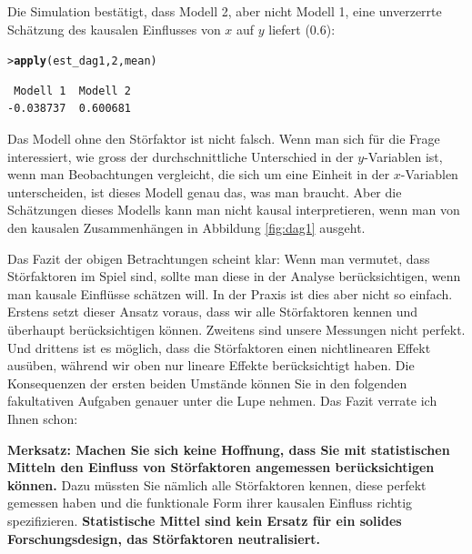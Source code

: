 \documentclass[oneside, 10pt]{book}\usepackage[]{graphicx}\usepackage[]{xcolor}
\makeatletter
\newcommand{\hlnum}[1]{\textcolor[rgb]{0.686,0.059,0.569}{#1}}%
\newcommand{\hlstd}[1]{\textcolor[rgb]{0.345,0.345,0.345}{#1}}%
\newcommand{\hlkwd}[1]{\textcolor[rgb]{0.737,0.353,0.396}{\textbf{#1}}}%
\newenvironment{kframe}{%
 \def\at@end@of@kframe{}%
 \ifinner\ifhmode%
  \def\at@end@of@kframe{\end{minipage}}%
  \begin{minipage}{\columnwidth}%
 \fi\fi%
 \def\FrameCommand##1{\hskip\@totalleftmargin \hskip-\fboxsep
 \colorbox{shadecolor}{##1}\hskip-\fboxsep
     \hskip-\linewidth \hskip-\@totalleftmargin \hskip\columnwidth}%
 \MakeFramed {\advance\hsize-\width
   \@totalleftmargin\z@ \linewidth\hsize
   \@setminipage}}%
 {\par\unskip\endMakeFramed%
 \at@end@of@kframe}
\newenvironment{knitrout}{}{} %
\makeatother
\begin{document}
Die Simulation bestätigt, dass Modell 2, aber nicht Modell 1,
eine unverzerrte Schätzung
des kausalen Einflusses von $x$ auf $y$ liefert (0.6):
\begin{knitrout}
\color{fgcolor}\begin{kframe}
\begin{alltt}
\hlstd{> }\hlkwd{apply}\hlstd{(est_dag1,} \hlnum{2}\hlstd{, mean)}
\end{alltt}
\begin{verbatim}
 Modell 1  Modell 2 
-0.038737  0.600681 
\end{verbatim}
\end{kframe}
\end{knitrout}

% 
Das Modell ohne den Störfaktor ist nicht falsch.
Wenn man sich für die Frage interessiert, wie gross
der durchschnittliche Unterschied in der $y$-Variablen
ist, wenn man Beobachtungen vergleicht, die sich um eine
Einheit in der $x$-Variablen unterscheiden, ist dieses
Modell genau das, was man braucht.
Aber die Schätzungen dieses Modells kann man nicht
kausal interpretieren, wenn man von den kausalen
Zusammenhängen in Abbildung \ref{fig:dag1} ausgeht.
% 

Das Fazit der obigen Betrachtungen scheint klar:
Wenn man vermutet, dass Störfaktoren im Spiel sind,
sollte man diese in der Analyse berücksichtigen,
wenn man kausale Einflüsse schätzen will.
In der Praxis ist dies aber nicht so einfach.
Erstens setzt dieser Ansatz voraus, dass wir
alle Störfaktoren kennen und überhaupt berücksichtigen
können. Zweitens sind unsere Messungen nicht perfekt.
Und drittens ist es möglich, dass die Störfaktoren
einen nichtlinearen Effekt ausüben, während wir
oben nur lineare Effekte berücksichtigt haben.
Die Konsequenzen der ersten beiden Umstände können Sie
in den folgenden fakultativen Aufgaben genauer unter
die Lupe nehmen. Das Fazit verrate ich Ihnen schon:

\medskip

\begin{framed}
\noindent \textbf{Merksatz: Machen Sie sich keine Hoffnung, dass Sie mit statistischen
Mitteln den Einfluss von Störfaktoren angemessen berücksichtigen können.}
Dazu müssten Sie nämlich alle Störfaktoren kennen, diese perfekt
gemessen haben und die funktionale Form ihrer kausalen Einfluss richtig
spezifizieren.
\textbf{Statistische Mittel sind kein Ersatz für ein solides Forschungsdesign,
das Störfaktoren neutralisiert.}
\end{framed}
\end{document}
